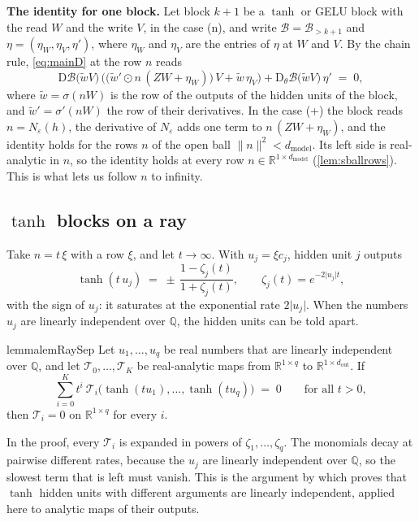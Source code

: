 \documentclass[10pt]{article}
\theoremstyle{definition}
\theoremstyle{remark}
\newcommand{\R}{\mathbb{R}}
\newcommand{\dm}{d_{\mathrm{model}}}
\newcommand{\Der}{\mathrm{D}}
\newcommand{\norm}[1]{\lVert #1\rVert}
\newcommand{\para}[1]{\smallskip\noindent\textbf{#1}\hspace{0.5em}}
\begin{document}
\para{The identity for one block.} Let block $k+1$ be a $\tanh$ or GELU block with the read $W$ and the write $V$, in the case (n), and write $\mathcal B = \mathcal B_{>k+1}$ and $\eta = (\eta_W, \eta_V, \eta')$, where $\eta_W$ and $\eta_V$ are the entries of $\eta$ at $W$ and $V$. By the chain rule, \eqref{eq:mainD} at the row $n$ reads
\begin{equation}\label{eq:mainL}
\Der\mathcal B\big(\tilde wV\big)\,\Big(\big(\tilde w'\odot n\,(ZW + \eta_W)\big)\,V + \tilde w\,\eta_V\Big) + \Der_\theta\mathcal B\big(\tilde wV\big)\,\eta' \;=\; 0 ,
\end{equation}
where $\tilde w = \sigma(nW)$ is the row of the outputs of the hidden units of the block, and $\tilde w' = \sigma'(nW)$ the row of their derivatives. In the case (+) the block reads $n = N_\varepsilon(h)$, the derivative of $N_\varepsilon$ adds one term to $n\,(ZW + \eta_W)$, and the identity holds for the rows $n$ of the open ball $\norm{n}^2 < \dm$. Its left side is real-analytic in $n$, so the identity holds at every row $n \in \R^{1\times\dm}$ (\cref{lem:sballrows}). This is what lets us follow $n$ to infinity.

\subsection{\texorpdfstring{$\tanh$}{tanh} blocks on a ray}\label{sec:raystanh}

Take $n = t\,\xi$ with a row $\xi$, and let $t \to \infty$. With $u_j = \xi c_j$, hidden unit $j$ outputs
\[
\tanh(t\,u_j) \;=\; \pm\,\frac{1 - \zeta_j(t)}{1 + \zeta_j(t)}, \qquad \zeta_j(t) = e^{-2\lvert u_j\rvert t},
\]
with the sign of $u_j$: it saturates at the exponential rate $2\lvert u_j\rvert$. When the numbers $u_j$ are linearly independent over $\mathbb Q$, the hidden units can be told apart.

\begin{restatable}{lemma}{lemRaySep}\label{lem:raysep}
Let $u_1, \dots, u_q$ be real numbers that are linearly independent over $\mathbb Q$, and let $\mathcal T_0, \dots, \mathcal T_K$ be real-analytic maps from $\R^{1\times q}$ to $\R^{1\times d_{\mathrm{out}}}$. If
\[
\sum_{i=0}^{K} t^i\ \mathcal T_i\big(\tanh(tu_1), \dots, \tanh(tu_q)\big) \;=\; 0 \qquad\text{for all } t > 0,
\]
then $\mathcal T_i = 0$ on $\R^{1\times q}$ for every $i$.
\end{restatable}

In the proof, every $\mathcal T_i$ is expanded in powers of $\zeta_1, \dots, \zeta_q$. The monomials decay at pairwise different rates, because the $u_j$ are linearly independent over $\mathbb Q$, so the slowest term that is left must vanish. This is the argument by which \citet[Lemma~3.1]{sussmann1992} proves that $\tanh$ hidden units with different arguments are linearly independent, applied here to analytic maps of their outputs.
\end{document}
